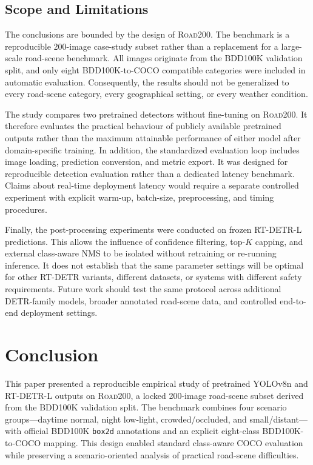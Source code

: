 \documentclass[runningheads]{llncs}
\begin{document}
\subsection{Scope and Limitations}

The conclusions are bounded by the design of \textsc{Road200}. The benchmark is a reproducible 200-image case-study subset rather than a replacement for a large-scale road-scene benchmark. All images originate from the BDD100K validation split, and only eight BDD100K-to-COCO compatible categories were included in automatic evaluation. Consequently, the results should not be generalized to every road-scene category, every geographical setting, or every weather condition.

The study compares two pretrained detectors without fine-tuning on \textsc{Road200}. It therefore evaluates the practical behaviour of publicly available pretrained outputs rather than the maximum attainable performance of either model after domain-specific training. In addition, the standardized evaluation loop includes image loading, prediction conversion, and metric export. It was designed for reproducible detection evaluation rather than a dedicated latency benchmark. Claims about real-time deployment latency would require a separate controlled experiment with explicit warm-up, batch-size, preprocessing, and timing procedures.

Finally, the post-processing experiments were conducted on frozen RT-DETR-L predictions. This allows the influence of confidence filtering, top-$K$ capping, and external class-aware NMS to be isolated without retraining or re-running inference. It does not establish that the same parameter settings will be optimal for other RT-DETR variants, different datasets, or systems with different safety requirements. Future work should test the same protocol across additional DETR-family models, broader annotated road-scene data, and controlled end-to-end deployment settings.

\FloatBarrier

\section{Conclusion}

This paper presented a reproducible empirical study of pretrained YOLOv8n and RT-DETR-L outputs on \textsc{Road200}, a locked 200-image road-scene subset derived from the BDD100K validation split. The benchmark combines four scenario groups---daytime normal, night low-light, crowded/occluded, and small/distant---with official BDD100K \texttt{box2d} annotations and an explicit eight-class BDD100K-to-COCO mapping. This design enabled standard class-aware COCO evaluation while preserving a scenario-oriented analysis of practical road-scene difficulties.
\end{document}
